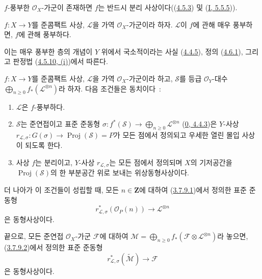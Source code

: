 $f$-풍부한 $\mathcal{O}_X$-가군이 존재하면 $f$는 반드시 분리
사상이다((\hyperref[II.4.5.3-ko]{4.5.3}) 및
(\hyperref[I.5.5.5-ko]{I, 5.5.5})).

\begin{proposition}[4.6.2]
\label{II.4.6.2-ko}
$f:X\to Y$를 준콤팩트 사상, $\mathcal{L}$을 가역
$\mathcal{O}_X$-가군이라 하자. $\mathcal{L}$이 $f$에 관해 매우
풍부하면, $f$에 관해 풍부하다.
\end{proposition}

이는 매우 풍부한 층의 개념이 $Y$ 위에서 국소적이라는 사실
(\hyperref[II.4.4.5-ko]{4.4.5}), 정의
(\hyperref[II.4.6.1-ko]{4.6.1}), 그리고 판정법
(\hyperref[II.4.5.10-ko]{4.5.10, (i)})에서 따른다.

\begin{proposition}[4.6.3]
\label{II.4.6.3-ko}
$f:X\to Y$를 준콤팩트 사상, $\mathcal{L}$을 가역
$\mathcal{O}_X$-가군이라 하고, $\mathcal{S}$를 등급
$\mathcal{O}_Y$-대수
$\bigoplus_{n\geq0}f_*(\mathcal{L}^{\otimes n})$라 하자. 다음 조건들은
동치이다~:
\begin{enumerate}
  \item[\rm{a)}] $\mathcal{L}$은 $f$-풍부하다.
  \item[\rm{b)}] $\mathcal{S}$는 준연접이고 표준 준동형
  $\sigma:f^*(\mathcal{S})\to
  \bigoplus_{n\geq0}\mathcal{L}^{\otimes n}$
  (\hyperref[0.4.4.3-ko]{0, 4.4.3})은 $Y$-사상
  $r_{\mathcal{L},\sigma}:G(\sigma)\to\operatorname{Proj}(\mathcal{S})=P$가
  모든 점에서 정의되고 우세한 열린 몰입 사상이 되도록 한다.
  \item[\rm{b')}] 사상 $f$는 분리이고, $Y$-사상
  $r_{\mathcal{L},\sigma}$는 모든 점에서 정의되며 $X$의 기저공간을
  $\operatorname{Proj}(\mathcal{S})$의 한 부분공간 위로 보내는
  위상동형사상이다.
\end{enumerate}
더 나아가 이 조건들이 성립할 때, 모든 $n\in\mathbf{Z}$에 대하여
(\hyperref[II.3.7.9.1-ko]{3.7.9.1})에서 정의한 표준 준동형
\begin{equation}
\label{II.4.6.3.1-ko}
  r_{\mathcal{L},\sigma}^*(\mathcal{O}_P(n))
  \longrightarrow\mathcal{L}^{\otimes n}
\tag{4.6.3.1}
\end{equation}
은 동형사상이다.

끝으로, 모든 준연접 $\mathcal{O}_X$-가군 $\mathcal{F}$에 대하여
$\mathcal{M}=\bigoplus_{n\geq0}f_*(\mathcal{F}\otimes
\mathcal{L}^{\otimes n})$라 놓으면,
(\hyperref[II.3.7.9.2-ko]{3.7.9.2})에서 정의한 표준 준동형
\begin{equation}
\label{II.4.6.3.2-ko}
  r_{\mathcal{L},\sigma}^*(\widetilde{\mathcal{M}})
  \longrightarrow\mathcal{F}
\tag{4.6.3.2}
\end{equation}
은 동형사상이다.
\end{proposition}

